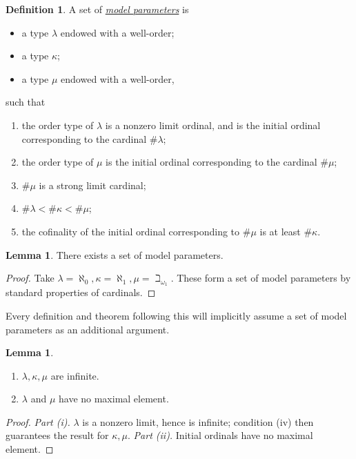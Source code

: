 \documentclass{article}
\newcommand{\cdef}[3]{\href{https://leanprover-community.github.io/con-nf/doc/ConNF/#1.html\#ConNF.#2}{\emph{#3}}}
\theoremstyle{definition}
\newtheorem{definition}{Definition}[section]
\newtheorem{lemma}[theorem]{Lemma}
\theoremstyle{remark}
\begin{document}
\begin{definition}
    \label{def:params}
    A set of \cdef{Atom/Params}{Params}{model parameters} is
    \begin{itemize}
        \item a type \( \lambda \) endowed with a well-order;
        \item a type \( \kappa \);
        \item a type \( \mu \) endowed with a well-order,
    \end{itemize}
    such that
    \begin{enumerate}
        \item the order type of \( \lambda \) is a nonzero limit ordinal, and is the initial ordinal corresponding to the cardinal \( \#\lambda \);
        \item the order type of \( \mu \) is the initial ordinal corresponding to the cardinal \( \#\mu \);
        \item \( \#\mu \) is a strong limit cardinal;
        \item \( \#\lambda < \#\kappa < \#\mu \);
        \item the cofinality of the initial ordinal corresponding to \( \#\mu \) is at least \( \#\kappa \).
    \end{enumerate}
\end{definition}
\begin{lemma}
    There exists a set of model parameters.
\end{lemma}
\begin{proof}
    Take \( \lambda = \aleph_0, \kappa = \aleph_1, \mu = \beth_{\omega_1} \).
    These form a set of model parameters by standard properties of cardinals.
\end{proof}
Every definition and theorem following this will implicitly assume a set of model parameters as an additional argument.
\begin{lemma}
    \label{lem:infinite_no_max_model_params}
    \begin{enumerate}
        \item \( \lambda, \kappa, \mu \) are infinite.
        \item \( \lambda \) and \( \mu \) have no maximal element.
    \end{enumerate}
\end{lemma}
\begin{proof}
    \emph{Part (i).}
    \( \lambda \) is a nonzero limit, hence is infinite; condition (iv) then guarantees the result for \( \kappa, \mu \).
    \emph{Part (ii).}
    Initial ordinals have no maximal element.
\end{proof}
\end{document}
